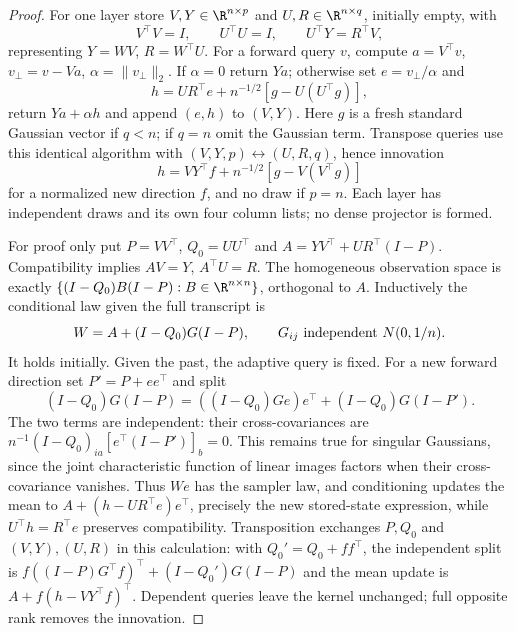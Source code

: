 \begin{proof}
For one layer store $V,Y\in\R^{n\times p}$ and $U,R\in\R^{n\times q}$,
initially empty, with
\[
V^\top V=I,\qquad U^\top U=I,\qquad U^\top Y=R^\top V,
\]
representing $Y=WV$, $R=W^\top U$. For a forward query $v$, compute
$a=V^\top v$, $v_\perp=v-Va$, $\alpha=\|v_\perp\|_2$.
If $\alpha=0$ return $Ya$; otherwise set $e=v_\perp/\alpha$ and
\begin{equation}
\label{cp:init:eq:sampler-forward}
h=UR^\top e+n^{-1/2}[g-U(U^\top g)],
\end{equation}
return $Ya+\alpha h$ and append $(e,h)$ to $(V,Y)$.
Here $g$ is a fresh standard Gaussian vector if $q<n$; if $q=n$
omit the Gaussian term. Transpose queries use this identical algorithm
with $(V,Y,p)\leftrightarrow(U,R,q)$, hence innovation
\begin{equation}
\label{cp:init:eq:sampler-transpose}
h=VY^\top f+n^{-1/2}[g-V(V^\top g)]
\end{equation}
for a normalized new direction $f$, and no draw if $p=n$.
Each layer has independent draws and its own four column lists; no
dense projector is formed.

For proof only put $P=VV^\top$, $Q_0=UU^\top$ and
$A=YV^\top+UR^\top(I-P)$. Compatibility implies $AV=Y$, $A^\top U=R$.
The homogeneous observation space is exactly
$\{(I-Q_0)B(I-P):B\in\R^{n\times n}\}$, orthogonal to $A$.
Inductively the conditional law given the full transcript is
\begin{equation}
\label{cp:init:eq:sampler-kernel}
W=A+(I-Q_0)G(I-P),\qquad G_{ij}\ {\rm independent}\ N(0,1/n).
\end{equation}
It holds initially. Given the past, the adaptive query is fixed.
For a new forward direction set $P'=P+ee^\top$ and split
\[
(I-Q_0)G(I-P)=((I-Q_0)Ge)e^\top+(I-Q_0)G(I-P').
\]
The two terms are independent: their cross-covariances are
$n^{-1}(I-Q_0)_{ia}[e^\top(I-P')]_b=0$.
This remains true for singular Gaussians, since the joint characteristic
function of linear images factors when their cross-covariance vanishes.
Thus $We$ has the sampler law, and conditioning updates the mean to
$A+(h-UR^\top e)e^\top$, precisely the new stored-state expression,
while $U^\top h=R^\top e$ preserves compatibility.
Transposition exchanges $P,Q_0$ and $(V,Y),(U,R)$ in this calculation:
with $Q_0'=Q_0+ff^\top$, the independent split is
$f((I-P)G^\top f)^\top+(I-Q_0')G(I-P)$ and the mean update is
$A+f(h-VY^\top f)^\top$.
Dependent queries leave the kernel unchanged; full opposite rank removes
the innovation.


\end{proof}
